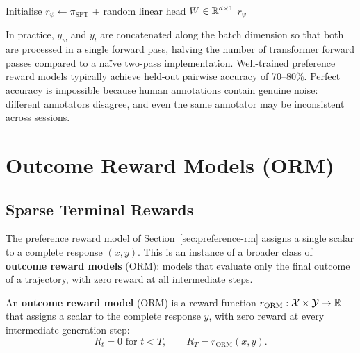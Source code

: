 \begin{algorithm}[ht]
\caption{Preference Reward Model Training}
\label{alg:rm-training}
Initialise $r_\psi \leftarrow \pi_{\mathrm{SFT}}$ + random linear head $W \in \mathbb{R}^{d\times 1}$\;
\Return $r_\psi$
\end{algorithm}

In practice, $y_w$ and $y_l$ are concatenated along the batch dimension so that both are processed in a single forward pass, halving the number of transformer forward passes compared to a naïve two-pass implementation. Well-trained preference reward models typically achieve held-out pairwise accuracy of 70--80\%. Perfect accuracy is impossible because human annotations contain genuine noise: different annotators disagree, and even the same annotator may be inconsistent across sessions.

\section{Outcome Reward Models (ORM)}
\label{sec:orm}

\subsection{Sparse Terminal Rewards}

The preference reward model of Section~\ref{sec:preference-rm} assigns a single scalar to a complete response $(x, y)$. This is an instance of a broader class of \textbf{outcome reward models} (ORM): models that evaluate only the final outcome of a trajectory, with zero reward at all intermediate steps.

\begin{definition}
\label{def:orm}
An \textbf{outcome reward model} (ORM) is a reward function $r_{\mathrm{ORM}} : \mathcal{X} \times \mathcal{Y} \to \mathbb{R}$ that assigns a scalar to the complete response $y$, with zero reward at every intermediate generation step:
\[
R_t = 0 \text{ for } t < T, \qquad R_T = r_{\mathrm{ORM}}(x, y).
\]
\end{definition}

